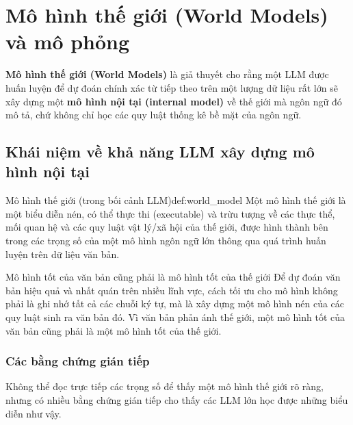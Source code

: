 
\section{Mô hình thế giới (World Models) và mô phỏng}
\label{sec:world_models}

\textbf{Mô hình thế giới (World Models)} là giả thuyết cho rằng một LLM được huấn luyện để dự đoán chính xác từ tiếp theo trên một lượng dữ liệu rất lớn sẽ xây dựng một \textbf{mô hình nội tại (internal model)} về thế giới mà ngôn ngữ đó mô tả, chứ không chỉ học các quy luật thống kê bề mặt của ngôn ngữ.

\subsection{Khái niệm về khả năng LLM xây dựng mô hình nội tại}
\label{ssec:internal_world_model_concept}

\begin{definition}{Mô hình thế giới (trong bối cảnh LLM)}{def:world_model}
    Một mô hình thế giới là một biểu diễn nén, có thể thực thi (executable) và trừu tượng về các thực thể, mối quan hệ và các quy luật vật lý/xã hội của thế giới, được hình thành bên trong các trọng số của một mô hình ngôn ngữ lớn thông qua quá trình huấn luyện trên dữ liệu văn bản.
\end{definition}

\begin{keyidea}{Mô hình tốt của văn bản cũng phải là mô hình tốt của thế giới}
Để dự đoán văn bản hiệu quả và nhất quán trên nhiều lĩnh vực, cách tối ưu cho mô hình không phải là ghi nhớ tất cả các chuỗi ký tự, mà là xây dựng một mô hình nén của các quy luật sinh ra văn bản đó. Vì văn bản phản ánh thế giới, một mô hình tốt của văn bản cũng phải là một mô hình tốt của thế giới.
\end{keyidea}

\subsubsection{Các bằng chứng gián tiếp}
Không thể đọc trực tiếp các trọng số để thấy một mô hình thế giới rõ ràng, nhưng có nhiều bằng chứng gián tiếp cho thấy các LLM lớn học được những biểu diễn như vậy.
